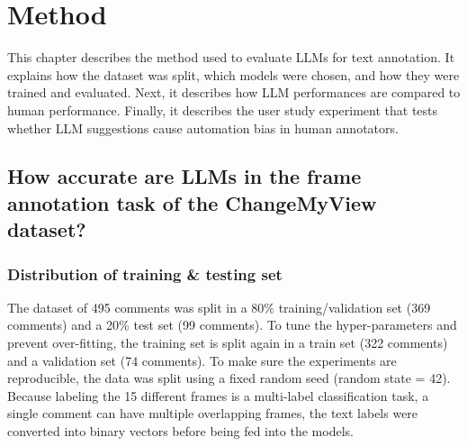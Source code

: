 \documentclass[
10pt, %
a4paper, %
oneside, %
headinclude,footinclude, %
] {book}%
\begin{document}
\chapter{Method}
This chapter describes the method used to evaluate LLMs for text annotation. It explains how the dataset was split, which models were chosen, and how they were trained and evaluated. Next, it describes how LLM performances are compared to human performance. Finally, it describes the user study experiment that tests whether LLM suggestions cause automation bias in human annotators.

 
\section{How accurate are LLMs in the frame annotation task of the ChangeMyView dataset?}
\subsection{Distribution of training \& testing set}
The dataset of 495 comments was split in a 80\% training/validation set (369 comments) and a 20\% test set (99 comments). To tune the hyper-parameters and prevent over-fitting, the training set is split again in a train set (322 comments) and a validation set (74 comments). To make sure the experiments are reproducible, the data was split using a fixed random seed (random state = 42). Because labeling the 15 different frames is a multi-label classification task, a single comment can have multiple overlapping frames, the text labels were converted into binary vectors before being fed into the models.
\end{document}
